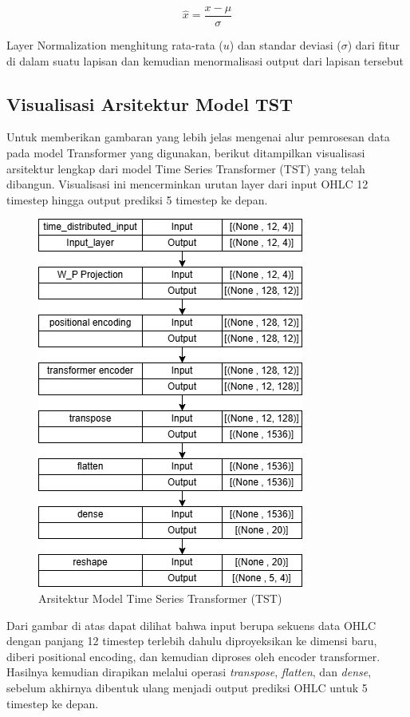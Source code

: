 \begin{equation}
    \hat{x} = \frac{x - \mu}{\sigma}
\end{equation}

Layer Normalization menghitung rata-rata (\( u \)) dan standar deviasi ($\sigma$) dari fitur di dalam suatu lapisan dan kemudian menormalisasi output dari lapisan tersebut

\subsection{Visualisasi Arsitektur Model TST}
Untuk memberikan gambaran yang lebih jelas mengenai alur pemrosesan data pada model Transformer yang digunakan, berikut ditampilkan visualisasi arsitektur lengkap dari model Time Series Transformer (TST) yang telah dibangun. Visualisasi ini mencerminkan urutan layer dari input OHLC 12 timestep hingga output prediksi 5 timestep ke depan.

\begin{figure}[H]
    \centering
    \includegraphics[scale=0.65]{gambar/tstars.png} 
    \caption{Arsitektur Model Time Series Transformer (TST)}
    \label{fig:tst_architecture}
\end{figure}

Dari gambar di atas dapat dilihat bahwa input berupa sekuens data OHLC dengan panjang 12 timestep terlebih dahulu diproyeksikan ke dimensi baru, diberi positional encoding, dan kemudian diproses oleh encoder transformer. Hasilnya kemudian dirapikan melalui operasi \textit{transpose}, \textit{flatten}, dan \textit{dense}, sebelum akhirnya dibentuk ulang menjadi output prediksi OHLC untuk 5 timestep ke depan.



